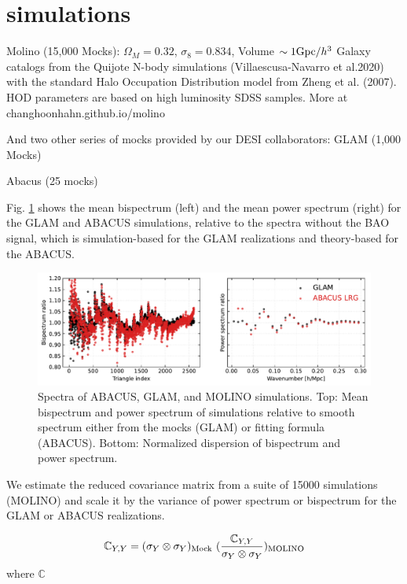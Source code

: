 \section{simulations}\label{sec:data}
Molino (15,000 Mocks): 
$\Omega_{M}=0.32$, $\sigma_{8}=0.834$, Volume $\sim 1 {\rm Gpc}/h^{3}$ 
Galaxy catalogs from the Quijote N-body simulations (Villaescusa-Navarro et al.2020) with the standard Halo Occupation Distribution model from Zheng et al. (2007). HOD parameters are based on high luminosity SDSS samples. More at changhoonhahn.github.io/molino

And two other series of mocks provided by our DESI collaborators:
GLAM (1,000 Mocks)

Abacus (25 mocks)


Fig. \ref{fig:data} shows the mean bispectrum (left) and the mean power spectrum (right) for the GLAM and ABACUS simulations, relative to the spectra without the BAO signal, which is simulation-based for the GLAM realizations and theory-based for the ABACUS.

\begin{figure}
\includegraphics[width=\textwidth]{figures/spectra.pdf}
\caption{Spectra of ABACUS, GLAM, and MOLINO simulations. Top: Mean bispectrum and power spectrum of simulations relative to smooth spectrum either from the mocks (GLAM) or fitting formula (ABACUS). Bottom: Normalized dispersion of bispectrum and power spectrum.}\label{fig:data}
\end{figure}


We estimate the reduced covariance matrix from a suite of 15000 simulations (MOLINO) and scale it by the variance of power spectrum or bispectrum for the GLAM or ABACUS realizations.

\begin{equation}
	\mathbb{C}_{Y,Y} = (\sigma_{Y} \otimes \sigma_{Y})_{\rm Mock} ~ (\frac{\mathbb{C}_{Y,Y}}{\sigma_{Y} \otimes \sigma_{Y}})_{\rm MOLINO}
\end{equation}
where $\mathbb{C}$



